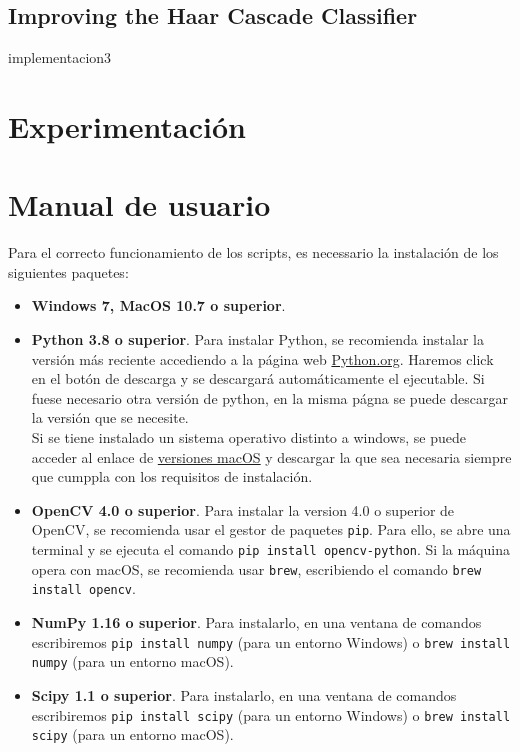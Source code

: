 \documentclass[a4paper]{article}
\begin{document}
\subsection{Improving the Haar Cascade Classifier}

implementacion3

\section{Experimentación}

\section{Manual de usuario}

Para el correcto funcionamiento de los scripts, es necessario la instalación de los siguientes paquetes:

\begin{itemize}
    \item \textbf{Windows 7, MacOS 10.7 o superior}.
    \item \textbf{Python 3.8 o superior}. Para instalar Python, se recomienda instalar la versión más reciente accediendo a la página web \href{https://www.python.org/downloads/}{Python.org}. Haremos click en el botón de descarga y se descargará automáticamente el ejecutable. Si fuese necesario otra versión de python, en la misma págna se puede descargar la versión que se necesite.\\
    Si se tiene instalado un sistema operativo distinto a windows, se puede acceder al enlace de \href{https://www.python.org/downloads/macos/}{versiones macOS} y descargar la que sea necesaria siempre que cumppla con los requisitos de instalación.
    \item \textbf{OpenCV 4.0 o superior}. Para instalar la version 4.0 o superior de OpenCV, se recomienda usar el gestor de paquetes \texttt{pip}. Para ello, se abre una terminal y se ejecuta el comando \texttt{pip install opencv-python}. Si la máquina opera con macOS, se recomienda usar \texttt{brew}, escribiendo el comando \texttt{brew install opencv}.
    \item \textbf{NumPy 1.16 o superior}. Para instalarlo, en una ventana de comandos escribiremos \texttt{pip install numpy} (para un entorno Windows) o \texttt{brew install numpy} (para un entorno macOS).
    \item \textbf{Scipy 1.1 o superior}. Para instalarlo, en una ventana de comandos escribiremos \texttt{pip install scipy} (para un entorno Windows) o \texttt{brew install scipy} (para un entorno macOS).
\end{itemize}
\end{document}
